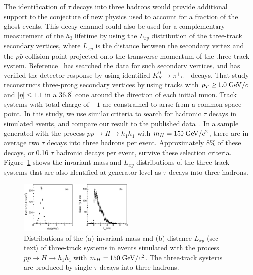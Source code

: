 \documentclass[twocolumn,10pt,prl,preprint,floatfix,nofootinbib,superscriptaddress,showpacs,amssymb]{revtex4}
\def\deg{^\circ}
\begin{document}
 The identification of $\tau$ decays into three hadrons would provide
 additional support to the conjecture of new physics used to account for
 a fraction of the ghost events. This decay channel could also be used 
 for a complementary measurement of the $h_3$ lifetime by using the
 $L_{xy}$ distribution of the three-track secondary vertices, where
 $L_{xy}$ is the distance between the secondary
 vertex  and the $p\bar{p}$ collision
 point projected onto the transverse momentum of the three-track
 system. Reference~\cite{a0disc} has searched the data for such secondary
 vertices, and has verified the detector response by using identified
 $K_S^0 \rightarrow \pi^+ \pi^- $ decays.
 That study~\cite{a0disc} reconstructs  
 three-prong secondary vertices by using tracks with $p_T \geq 1.0 \; {\rm GeV/}c$ and
 $|\eta| \leq 1.1$ in a $36.8^{\deg}$ cone around the direction of 
 each initial muon. Track systems with total charge of $\pm 1$ are 
 constrained to arise from a common space point. 
 In this study, we use similar criteria to search for
 hadronic $\tau$ decays in simulated events, and compare our result to the
 published data~\cite{a0disc}. In a sample  generated 
 with the process $p\bar{p} \rightarrow H \rightarrow h_1 h_1$ with
 $m_H=150 \; {\rm GeV/}c^2$, there are in average two $\tau$ decays
 into three hadrons per event. Approximately 8\% of these decays, or 0.16 $\tau$
 hadronic decays per event, survive these selection criteria.
 Figure~\ref{fig:fig_32} shows the invariant mass and $L_{xy}$ distributions
 of the three-track systems that are also identified at generator level as
 $\tau$ decays into three hadrons.
 \begin{figure}
 \begin{center}
 \vspace{-0.3in}
 \leavevmode
 \includegraphics*[width=0.5\textwidth]{fa0_32.eps}
 \caption[]{Distributions of the (a) invariant mass and (b) distance $L_{xy}$
            (see text) of three-track systems in events simulated with the 
            process $p\bar{p} \rightarrow H \rightarrow h_1 h_1$ with 
            $m_H=150 \; {\rm GeV/}c^2$. The three-track systems are produced by
            single $\tau$ decays into three hadrons. } 
 \label{fig:fig_32}
 \end{center}
 \end{figure}
 
\end{document}
